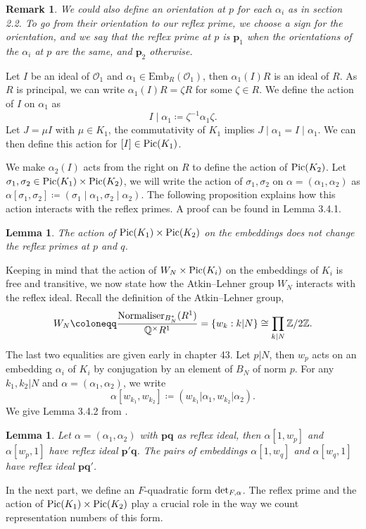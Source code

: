 \documentclass[a4paper,12pt]{article}
\newtheorem{remark}[theorem]{Remark}
\newtheorem{lemma}[theorem]{Lemma}
\begin{document}
\begin{remark}
    We could also define an orientation at $p$ for each $\alpha_i$ as in \cite{BertoliniDarmon1996} section 2.2. To go from their orientation to our reflex prime, we choose a sign for the orientation, and we say that the reflex prime at $p$ is $\mathbf{p}_1$ when the orientations of the $\alpha_i$ at $p$ are the same, and $\mathbf{p}_2$ otherwise.
\end{remark}
Let $I$ be an ideal of $\mathcal{O}_{1}$ and $\alpha_1\in\text{Emb}_R(\mathcal{O}_{1})$, then $\alpha_1(I)R$ is an ideal of $R$. As $R$ is principal, we can write $\alpha_1(I)R=\zeta R$ for some $\zeta\in R$. We define the action of $I$ on $\alpha_1$ as 
\begin{equation}\label{action of Pic}
  I\mid \alpha_1\coloneqq \zeta^{-1}\alpha_1\zeta.   
\end{equation}
    Let $J=\mu I$ with $\mu\in K_1$, the commutativity of $K_1$ implies $J\mid\alpha_1=I\mid\alpha_1$. We can then define this action for $[I]\in\textup{Pic}(K_1)$.
\par
 We make $\alpha_2(I)$ acts from the right on $R$ to define the action of $\textup{Pic}(K_2)$. Let $\sigma_1,\sigma_2\in\textup{Pic}(K_1)\times\textup{Pic}(K_2)$, we will write the action of $\sigma_1,\sigma_2$ on $\alpha=(\alpha_1,\alpha_2)$ as $\alpha [\sigma_1,\sigma_2]\coloneqq (\sigma_1\mid\alpha_1,\sigma_2\mid\alpha_2)$. 
The following proposition explains how this action interacts with the reflex primes. A proof can be found in \cite{Daas} Lemma 3.4.1.
\begin{lemma}
    The action of $\textup{Pic}(K_1)\times\textup{Pic}(K_2)$ on the embeddings does not change the reflex primes at $p$ and $q$.  
\end{lemma}
Keeping in mind that the action of  $W_N\times\textup{Pic}(K_i)$ on the embeddings of $K_i$ is free and transitive, we now state how the Atkin--Lehner group $W_N$ interacts with the reflex ideal. 
Recall the definition of the Atkin--Lehner group, 
\begin{equation}\label{atkin lehner def}
    W_N\coloneqq \frac{\textup{Normaliser}_{B_N^*}(R^1)}{\mathbb{Q}^\times R^1}=\{w_k:k|N\}\cong \prod_{k|N}\mathbb{Z}/2\mathbb{Z}.
\end{equation}
The last two equalities are given early in \cite{Voightquaternion} chapter 43.
Let $p|N$, then $w_p$ acts on an embedding $\alpha_i$ of $K_i$ by conjugation by an element of $B_N$ of norm $p$. For any $k_1,k_2|N$ and $\alpha=(\alpha_1,\alpha_2)$, we write 
\[\alpha[w_{k_1},w_{k_2}]\coloneqq (w_{k_1}\vert\alpha_1,w_{k_2}\vert\alpha_2).\]
 We give Lemma 3.4.2 from \cite{Daas}.
\begin{lemma}\label{atkin lehner reflex prime}
    Let $\alpha=(\alpha_1,\alpha_2)$ with $\mathbf{p}\mathbf{q}$ as reflex ideal, then $\alpha[1,w_p]$ and $\alpha[w_p,1]$ have reflex ideal $\mathbf{p}'\mathbf{q}$. The pairs of embeddings $\alpha[1,w_q]$ and $\alpha[w_q,1]$ have reflex ideal $\mathbf{p}\mathbf{q}'$.
\end{lemma}
In the next part, we define an $F$-quadratic form $\textup{det}_{F,\alpha}$. The reflex prime and the action of $\textup{Pic}(K_1)\times\textup{Pic}(K_2)$ play a crucial role in the way we count representation numbers of this form.
\end{document}

